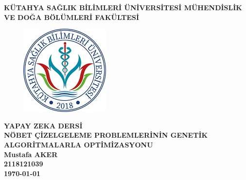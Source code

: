 \documentclass[12pt, a4paper]{article}
\begin{document}
\textbf{KÜTAHYA SAĞLIK BİLİMLERİ ÜNİVERSİTESİ
MÜHENDİSLİK VE DOĞA BÖLÜMLERİ FAKÜLTESİ}\centering \\[20pt]

\begin{figure}[!h]
	\centering
	\includegraphics{ksbu.png}
	\\[20pt]
\end{figure}

\textbf{YAPAY ZEKA DERSİ}\centering\\[20pt]
		
\textbf{NÖBET ÇİZELGELEME PROBLEMLERİNİN GENETİK ALGORİTMALARLA OPTİMİZASYONU}\centering\\[15pt]
		
\textbf{Mustafa AKER} \\[10pt] 
\textbf{2118121039} \\[10pt]
\textbf{\today}

	
	
	

	\newpage	
		
\end{document}
